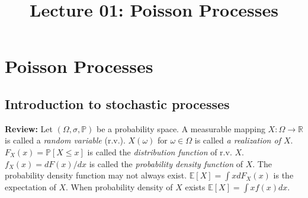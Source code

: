 \documentclass[all-lectures.tex]{subfiles}
\title{Lecture 01: Poisson Processes}
\author{}
\begin{document}

\chapter{Poisson Processes}
\setcounter{section}{0}
\setcounter{subsection}{0}
\section*{}
\section{Introduction to stochastic processes}

\indent \textbf{Review:} Let $(\Omega,\sigma,\mathbb{P})$ be a probability space. A measurable mapping $X:\Omega \to \mathbb{R}$ is called a \textit{random variable} (r.v.). $X(\omega)$ for $\omega \in \Omega$ is called \textit{a realization of $X$}. $F_X (x) = \mathbb{P}[X\leq x]$ is called the \textit{distribution function} of r.v. $X$. $f_X(x) = dF(x)/dx$ is called the \textit{probability density function} of $X$. The probability density function may not always exist. $\mathbb{E}[X] = \int x dF_X(x) $ is the expectation of $X$. When probability density of $X$ exists $\mathbb{E}[X] = \int xf(x)dx$.\\
\end{document}
